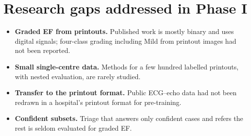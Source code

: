 \section{Research gaps addressed in Phase I}\label{sec:2.4}

\begin{itemize}
  \item \textbf{Graded EF from printouts.} Published work is mostly binary and uses digital signals; four-class grading including Mild from printout images had not been reported.
  \item \textbf{Small single-centre data.} Methods for a few hundred labelled printouts, with nested evaluation, are rarely studied.
  \item \textbf{Transfer to the printout format.} Public ECG--echo data had not been redrawn in a hospital's printout format for pre-training.
  \item \textbf{Confident subsets.} Triage that answers only confident cases and refers the rest is seldom evaluated for graded EF.
\end{itemize}
